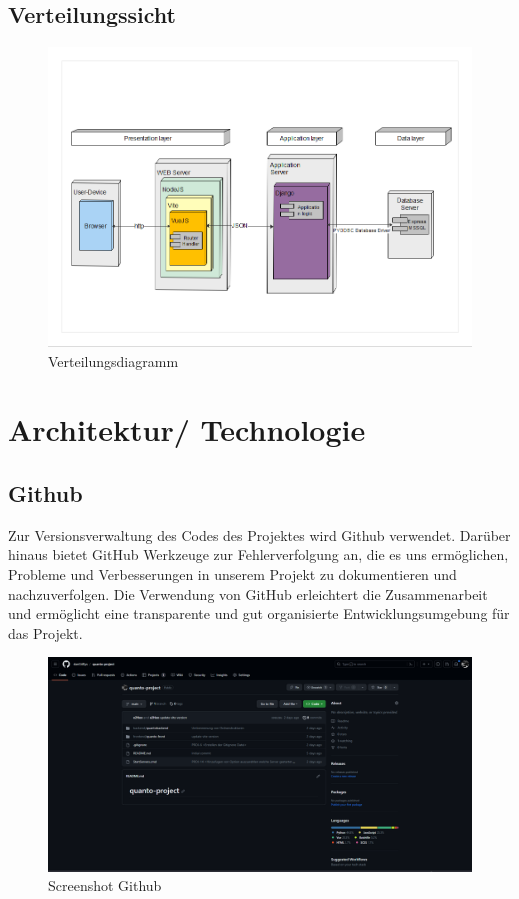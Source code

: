 \documentclass{article}
\begin{document}
\subsection{ Verteilungssicht}
\begin{figure}[h]

    \includegraphics[width= \textwidth]{images/Verteilungssicht.png}
    \caption{Verteilungsdiagramm}
    \label{fig:beispiel}
\end{figure}

\newpage

\section{Architektur/ Technologie}

\subsection{Github}
Zur Versionsverwaltung des Codes des Projektes wird Github verwendet. Darüber
hinaus bietet GitHub Werkzeuge zur Fehlerverfolgung an, die es uns ermöglichen,
Probleme und Verbesserungen in unserem Projekt zu dokumentieren und
nachzuverfolgen. Die Verwendung von GitHub erleichtert die Zusammenarbeit und
ermöglicht eine transparente und gut organisierte Entwicklungsumgebung für das
Projekt.

\begin{figure}[h]
    \centering
    \includegraphics[width= \textwidth]{images/GitHub.png}
    \caption{Screenshot Github}
    \label{fig:beispiel}
\end{figure}
\end{document}
